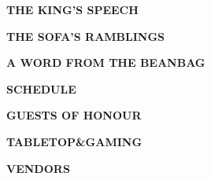 \documentclass[12pt]{article}
\newcommand{\altf}[1]{\textsf{\textbf{\uppercase{#1}}}}
\newcommand{\head}[1]{%
  \begin{center}
    {\Huge\altf{\textbullet{} #1 \textbullet{}}}
  \end{center}%
}
\begin{document}
%

\clearpage
%
\head{The King's Speech}
\clearpage
%
\head{The Sofa's Ramblings}
\clearpage
%
\head{A Word from the Beanbag}
\clearpage
%
\head{Schedule}

\clearpage
%
\head{Guests of Honour}

\clearpage
%
\head{Tabletop\&Gaming}
\vfill
\head{Vendors}

\vfill
\clearpage
\end{document}
